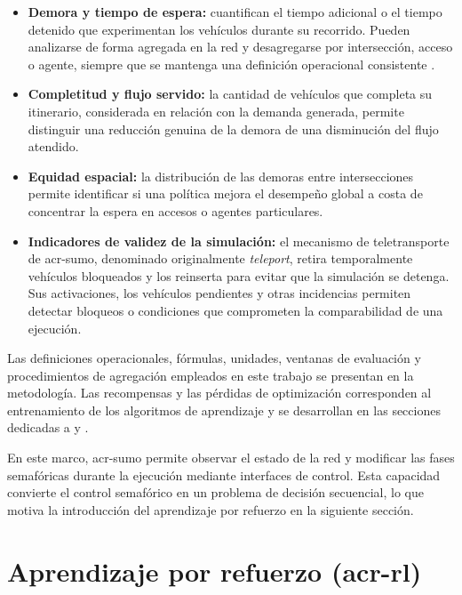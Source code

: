 \begin{itemize}
    \item \textbf{Demora y tiempo de espera:} cuantifican el tiempo adicional o el tiempo detenido que experimentan los vehículos durante su recorrido. Pueden analizarse de forma agregada en la red y desagregarse por intersección, acceso o agente, siempre que se mantenga una definición operacional consistente \cite{calymayor,SUMO2026_SUMO}.
    \item \textbf{Completitud y flujo servido:} la cantidad de vehículos que completa su itinerario, considerada en relación con la demanda generada, permite distinguir una reducción genuina de la demora de una disminución del flujo atendido.
    \item \textbf{Equidad espacial:} la distribución de las demoras entre intersecciones permite identificar si una política mejora el desempeño global a costa de concentrar la espera en accesos o agentes particulares.
    \item \textbf{Indicadores de validez de la simulación:} el mecanismo de teletransporte de \acrshort{acr-sumo}, denominado originalmente \textit{teleport}, retira temporalmente vehículos bloqueados y los reinserta para evitar que la simulación se detenga. Sus activaciones, los vehículos pendientes y otras incidencias permiten detectar bloqueos o condiciones que comprometen la comparabilidad de una ejecución.
\end{itemize}

Las definiciones operacionales, fórmulas, unidades, ventanas de evaluación y procedimientos de agregación empleados en este trabajo se presentan en la metodología. Las recompensas y las pérdidas de optimización corresponden al entrenamiento de los algoritmos de aprendizaje y se desarrollan en las secciones dedicadas a  y .

En este marco, \acrshort{acr-sumo} permite observar el estado de la red y modificar las fases semafóricas durante la ejecución mediante interfaces de control. Esta capacidad convierte el control semafórico en un problema de decisión secuencial, lo que motiva la introducción del aprendizaje por refuerzo en la siguiente sección.


\section[Aprendizaje por refuerzo (RL)]{Aprendizaje por refuerzo (\acrshort{acr-rl})}\label{sec:rl}

